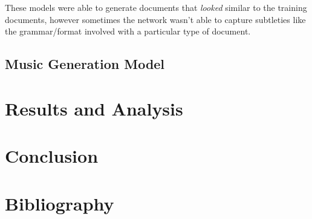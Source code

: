 \documentclass[11pt]{article}
\begin{document}
These models were able to generate documents that \emph{looked} similar to the training documents, however sometimes the network wasn't able to capture subtleties like the grammar/format involved with a particular type of document.

\subsection{Music Generation Model}


\section{Results and Analysis}
\section{Conclusion}
\section{Bibliography}
\end{document}
